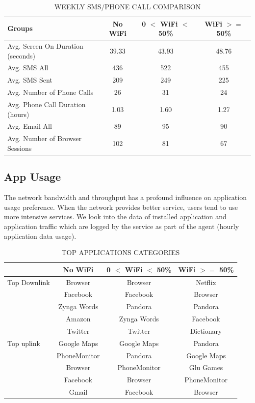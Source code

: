 \begin{table}[h!tbp] 
\caption{WEEKLY SMS/PHONE CALL COMPARISON} 
\label{table:sms_phone}
\centering 
\begin{tabular}{|l|c|c|c|}
\hline
Groups & No WiFi& 0 $<$ WiFi $<$ 50\% & WiFi $>=$ 50\%\\
\hline Avg. Screen On Duration (seconds) & 39.33 & 43.93 & 48.76\\
\hline Avg. SMS All& 436 & 522 & 455  \\ 
\hline Avg. SMS Sent & 209 & 249 & 225 \\
\hline Avg. Number of Phone Calls & 26 & 31 & 24 \\
\hline Avg. Phone Call Duration (hours) & 1.03 & 1.60 & 1.27 \\
\hline Avg. Email All & 89 & 95 & 90\\
\hline Avg. Number of Browser Sessions & 102 & 81 & 67\\
\hline
\end{tabular}
\end{table}

\subsection{App Usage}\label{app}

The network bandwidth and throughput has a profound influence on application usage preference. When the network provides better service,
users tend to use more intensive services.   We look into the data of installed application and application traffic which are logged by the service as part of the agent (hourly application data usage). 

\begin{table}[h!tbp] 
\caption{TOP APPLICATIONS CATEGORIES} 
\label{table:app_categories}
\centering 
\begin{tabular}{|l|c|c|c|}
\hline
& No WiFi & 0 $<$ WiFi $<$ 50\% & WiFi $>=$ 50\%\\
\hline
Top Downlink & Browser & Browser & Netflix\\ 
					& Facebook & Facebook & Browser\\
					& Zynga Words & Pandora & Pandora\\
					& Amazon & Zynga Words & Facebook\\
					& Twitter & Twitter & Dictionary\\
\hline
Top uplink & Google Maps & Google Maps & Pandora\\ 
					& PhoneMonitor & Pandora & Google Maps\\
					& Browser & PhoneMonitor & Glu Games\\
					& Facebook &Browser&PhoneMonitor\\
					& Gmail & Facebook&Browser\\
\hline
\end{tabular}
\end{table}


